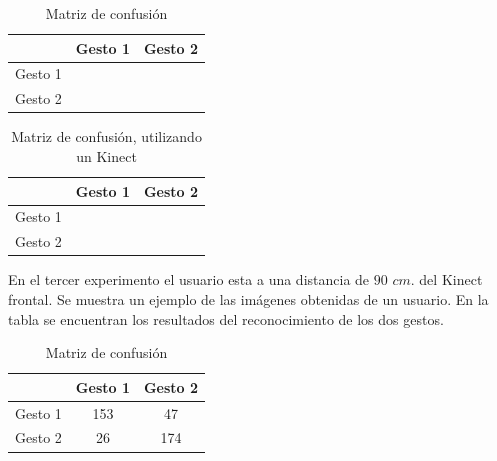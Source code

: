 \begin{table}[h!] 
\begin{center}
\begin{tabular}{ r || c | c |} 
 
        & Gesto 1 & Gesto 2 \\ \hline \hline  
Gesto 1 &      &       \\ \hline  
Gesto 2 &      &     \\   

\end{tabular}
\end{center} 
\caption{Matriz de confusión}
\end{table} 

\begin{table}[h!] 
\begin{center}
\begin{tabular}{ r || c | c |} 
 
        & Gesto 1 & Gesto 2 \\ \hline \hline  
Gesto 1 &      &     \\ \hline  
Gesto 2 &      &     \\   

\end{tabular}
\end{center} 
\caption{Matriz de confusión, utilizando un Kinect} 
\end{table} 
 

En el tercer experimento el usuario esta a una distancia de $90$ $cm.$ del Kinect frontal. Se muestra un ejemplo de las imágenes obtenidas de un usuario. En la tabla se encuentran los resultados del reconocimiento de los dos gestos.    


\begin{table}[h!] 
\begin{center}
\begin{tabular}{ r || c | c |} 
 
        & Gesto 1 & Gesto 2 \\ \hline \hline  
Gesto 1 & 153     &  47     \\ \hline  
Gesto 2 & 26      & 174     \\   

\end{tabular}
\end{center} 
\caption{Matriz de confusión}
\end{table}

